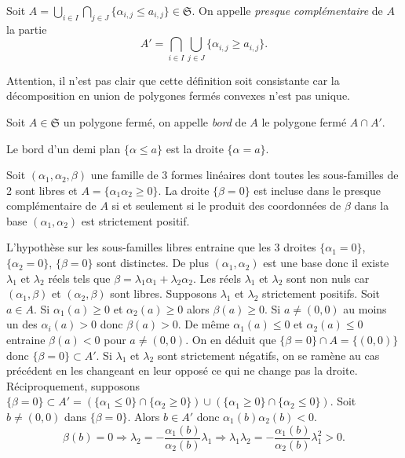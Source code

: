 \begin{defi}
 Soit $A = \bigcup_{i \in I} \bigcap_{j \in J}\{ \alpha_{i,j} \leq a_{i,j}\} \in \mathfrak{S}$. On appelle \emph{presque complémentaire} de $A$ la partie
 \begin{displaymath}
  A' = \bigcap_{i \in I} \bigcup_{j \in J}\{ \alpha_{i,j} \geq a_{i,j}\}.
 \end{displaymath}
\end{defi}
Attention, il n'est pas clair que cette définition soit consistante car la décomposition en union de polygones fermés convexes n'est pas unique.
\begin{defi}
 Soit $A \in \mathfrak{S}$ un polygone fermé, on appelle \emph{bord} de $A$ le polygone fermé $A \cap A'$.
\end{defi}
\begin{exple}
Le bord d'un demi plan $\{\alpha \leq a\}$ est la droite $\{\alpha = a\}$.
\end{exple}
\begin{lem}
 Soit $(\alpha_1, \alpha_2, \beta)$ une famille de 3 formes linéaires dont toutes les sous-familles de 2 sont libres et $A = \{\alpha_1 \alpha_2\geq 0\}$.\newline
 La droite $\{ \beta = 0 \}$ est incluse dans le presque complémentaire de $A$ si et seulement si le produit des coordonnées de $\beta$ dans la base $(\alpha_1, \alpha_2)$ est strictement positif.
\end{lem}
\begin{demo}
L'hypothèse sur les sous-familles libres entraine que les 3 droites $\{\alpha_1 = 0\}$, $\{\alpha_2 = 0\}$, $\{\beta = 0\}$ sont distinctes. De plus $(\alpha_1, \alpha_2)$ est une base donc il existe $\lambda_1$ et $\lambda_2$ réels tels que $\beta = \lambda_1 \alpha_1 + \lambda_2 \alpha_2$. Les réels $\lambda_1$ et $\lambda_2$ sont non nuls car $(\alpha_1, \beta)$ et $(\alpha_2, \beta)$ sont libres.\newline
Supposons $\lambda_1$ et $\lambda_2$ strictement positifs. Soit $a \in A$. Si $\alpha_1(a) \geq 0$ et $\alpha_2(a) \geq 0$ alors $\beta(a)\geq 0$. Si $a\neq(0,0)$ au moins un des $\alpha_i(a)>0$ donc $\beta(a) > 0$. De même $\alpha_1(a) \leq 0$ et $\alpha_2(a) \leq 0$ entraine $\beta(a)<0$ pour $a\neq (0,0)$. On en déduit que $\{\beta = 0\} \cap A = \{(0,0)\}$ donc $\{\beta = 0\} \subset  A'$. Si $\lambda_1$ et $\lambda_2$ sont strictement négatifs, on se ramène au cas précédent en les changeant en leur opposé ce qui ne change pas la droite. \newline
Réciproquement, supposons $\{\beta = 0\} \subset A' = \left(\{\alpha_1 \leq 0\} \cap \{\alpha_2 \geq 0\}\right) \cup \left(\{\alpha_1 \geq 0\} \cap \{\alpha_2 \leq 0\}\right)$. Soit $b \neq (0,0)$ dans $\{\beta = 0\}$. Alors $b \in A'$ donc $\alpha_1(b) \alpha_2(b) <0$.
\begin{displaymath}
 \beta(b) = 0 \Rightarrow \lambda_2 = - \frac{\alpha_1(b)}{\alpha_2(b)} \lambda_1 \Rightarrow \lambda_1 \lambda_2 = - \frac{\alpha_1(b)}{\alpha_2(b)} \lambda_{1}^2 > 0.
\end{displaymath}
\end{demo}

